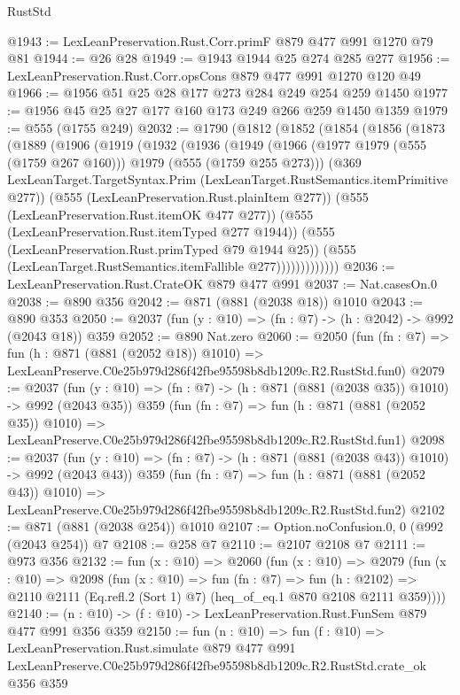 \begin{lexlean}{RustStd}
\begin{coremodule}
@1943 := LexLeanPreservation.Rust.Corr.primF @879 @477 @991 @1270 @79 @81
@1944 := @26 @28
@1949 := @1943 @1944 @25 @274 @285 @277
@1956 := LexLeanPreservation.Rust.Corr.opsCons @879 @477 @991 @1270 @120 @49
@1966 := @1956 @51 @25 @28 @177 @273 @284 @249 @254 @259 @1450
@1977 := @1956 @45 @25 @27 @177 @160 @173 @249 @266 @259 @1450 @1359
@1979 := @555 (@1755 @249)
@2032 := @1790
    (@1812
      (@1852
        (@1854
          (@1856
            (@1873
              (@1889
                (@1906
                  (@1919
                    (@1932
                      (@1936
                        (@1949
                          (@1966
                            (@1977 @1979 (@555 (@1759 @267 @160)))
                            @1979
                            (@555 (@1759 @255 @273)))
                          (@369
                            LexLeanTarget.TargetSyntax.Prim
                            (LexLeanTarget.RustSemantics.itemPrimitive @277))
                          (@555 (LexLeanPreservation.Rust.plainItem @277))
                          (@555 (LexLeanPreservation.Rust.itemOK @477 @277))
                          (@555 (LexLeanPreservation.Rust.itemTyped @277 @1944))
                          (@555 (LexLeanPreservation.Rust.primTyped @79 @1944 @25))
                          (@555 (LexLeanTarget.RustSemantics.itemFallible @277)))))))))))))
@2036 := LexLeanPreservation.Rust.CrateOK @879 @477 @991
@2037 := Nat.casesOn.{0}
@2038 := @890 @356
@2042 := @871 (@881 (@2038 @18)) @1010
@2043 := @890 @353
@2050 := @2037 (fun (y : @10) => (fn : @7) -> (h : @2042) -> @992 (@2043 @18)) @359
@2052 := @890 Nat.zero
@2060 := @2050
    (fun (fn : @7) =>
    fun (h : @871 (@881 (@2052 @18)) @1010) =>
    LexLeanPreserve.C0e25b979d286f42fbe95598b8db1209c.R2.RustStd.fun0)
@2079 := @2037
    (fun (y : @10) => (fn : @7) -> (h : @871 (@881 (@2038 @35)) @1010) -> @992 (@2043 @35))
    @359
    (fun (fn : @7) =>
    fun (h : @871 (@881 (@2052 @35)) @1010) =>
    LexLeanPreserve.C0e25b979d286f42fbe95598b8db1209c.R2.RustStd.fun1)
@2098 := @2037
    (fun (y : @10) => (fn : @7) -> (h : @871 (@881 (@2038 @43)) @1010) -> @992 (@2043 @43))
    @359
    (fun (fn : @7) =>
    fun (h : @871 (@881 (@2052 @43)) @1010) =>
    LexLeanPreserve.C0e25b979d286f42fbe95598b8db1209c.R2.RustStd.fun2)
@2102 := @871 (@881 (@2038 @254)) @1010
@2107 := Option.noConfusion.{0, 0} (@992 (@2043 @254)) @7
@2108 := @258 @7
@2110 := @2107 @2108 @7
@2111 := @973 @356
@2132 := fun (x : @10) =>
  @2060
    (fun (x : @10) =>
    @2079
      (fun (x : @10) =>
      @2098
        (fun (x : @10) =>
        fun (fn : @7) =>
        fun (h : @2102) =>
        @2110 @2111 (Eq.refl.{2} (Sort 1) @7) (heq_of_eq.{1} @870 @2108 @2111 @359))))
@2140 := (n : @10) -> (f : @10) -> LexLeanPreservation.Rust.FunSem @879 @477 @991 @356 @359
@2150 := fun (n : @10) =>
  fun (f : @10) =>
  LexLeanPreservation.Rust.simulate
    @879
    @477
    @991
    LexLeanPreserve.C0e25b979d286f42fbe95598b8db1209c.R2.RustStd.crate_ok
    @356
    @359
\end{coremodule}
\end{lexlean}
